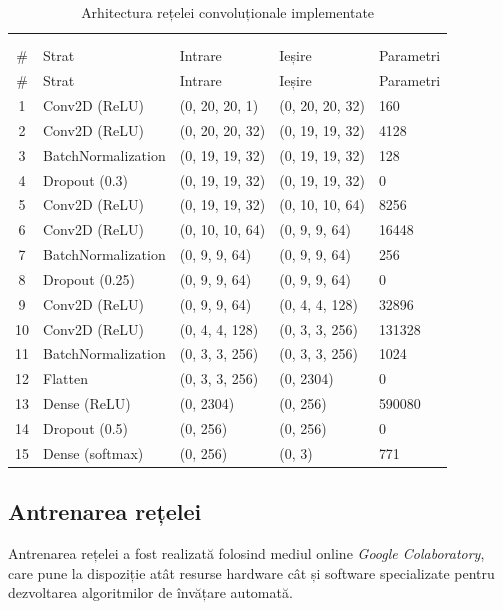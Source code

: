 \begin{longtable}{@{}c*4l@{}}
\renewcommand{\arraystretch}{1.2}\\
\caption{Arhitectura rețelei convoluționale implementate}\label{tabel:cnn-arch}\\
\rowcolor{gray!50}
\# & Strat & Intrare & Ieșire & Parametri \\
\endfirsthead
\rowcolor{gray!50}
\# & Strat & Intrare & Ieșire & Parametri \\
\endhead
1 & Conv2D (ReLU) & (0, 20, 20, 1) & (0, 20, 20, 32) & 160 \\
2 & Conv2D (ReLU) & (0, 20, 20, 32) & (0, 19, 19, 32) & 4128 \\
3 & BatchNormalization & (0, 19, 19, 32) & (0, 19, 19, 32) & 128 \\
4 & Dropout (0.3) & (0, 19, 19, 32) & (0, 19, 19, 32) & 0 \\
5 & Conv2D (ReLU) & (0, 19, 19, 32) & (0, 10, 10, 64) & 8256 \\
6 & Conv2D (ReLU) & (0, 10, 10, 64) & (0, 9, 9, 64) & 16448 \\
7 & BatchNormalization & (0, 9, 9, 64) & (0, 9, 9, 64) & 256 \\
8 & Dropout (0.25) & (0, 9, 9, 64) & (0, 9, 9, 64) & 0 \\
9 & Conv2D (ReLU) & (0, 9, 9, 64) & (0, 4, 4, 128) & 32896 \\
10 & Conv2D (ReLU) & (0, 4, 4, 128) & (0, 3, 3, 256) & 131328 \\
11 & BatchNormalization & (0, 3, 3, 256) & (0, 3, 3, 256) & 1024 \\ \midrule
12 & Flatten & (0, 3, 3, 256) & (0, 2304) & 0 \\
13 & Dense (ReLU) & (0, 2304) & (0, 256) & 590080 \\
14 & Dropout (0.5) & (0, 256) & (0, 256) & 0 \\
15 & Dense (softmax) & (0, 256) & (0, 3) & 771 \\ \bottomrule
\end{longtable}

\subsection{Antrenarea rețelei}\label{ssch:antrenarea}
Antrenarea rețelei a fost realizată folosind mediul online \textit{Google Colaboratory}, care pune la dispoziție atât resurse hardware cât și software specializate pentru dezvoltarea algoritmilor de învățare automată.

